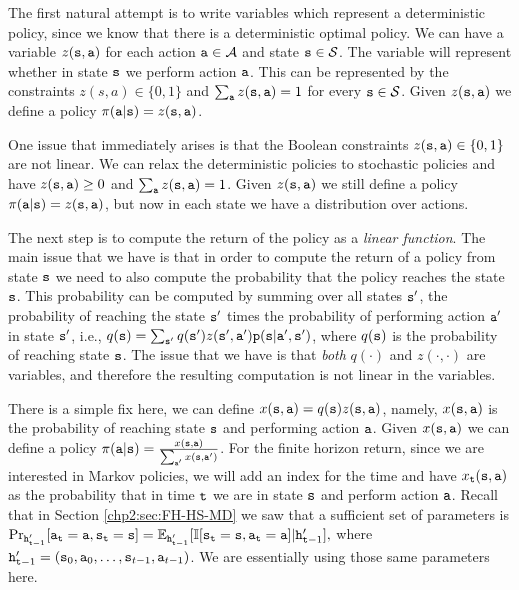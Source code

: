 The first natural attempt is to write variables which represent a deterministic policy, since we know that there is a deterministic optimal policy. We can have a variable $z({\tt s},{\tt a})$ for each action ${\tt a}\in\mathcal{A}$ and state ${\tt s}\in\mathcal{S}$. The variable will represent whether in state ${\tt s}$ we perform action ${\tt a}$. This can be represented by the constraints $z(s,a)\in\{0,1\}$ and $\sum_{{\tt a}}z({\tt s},{\tt a})=1$ for every ${\tt s} \in\mathcal{S}$. Given $z({\tt s},{\tt a})$ we define a policy $\pi({\tt a}|{\tt s})=z({\tt s},{\tt a})$.

One issue that immediately arises is that the Boolean constraints $z({\tt s},{\tt a})\in\{0,1\}$ are not linear. We can relax the deterministic policies to stochastic policies and have $z({\tt s},{\tt a})\geq 0$ and $\sum_{{\tt a}}z({\tt s},{\tt a})=1$. Given $z({\tt s},{\tt a})$ we still define a policy $\pi({\tt a}|{\tt s})=z({\tt s},{\tt a})$, but now in each state we have a distribution over actions.

The next step is to compute the return of the policy as a \textit{linear function}. The main issue that we have is that in order to compute the return of a policy from state ${\tt s}$ we need to also compute the probability that the policy reaches the state ${\tt s}$. This probability can be computed by summing over all states ${\tt s}'$, the probability of reaching the state ${\tt s}'$ times the probability of performing action ${\tt a}'$ in state ${\tt s}'$, i.e., $q({\tt s})=\sum_{{\tt s}'} q({\tt s}' )z({\tt s}',{\tt a}'){\tt p}({\tt s}|{\tt a}',{\tt s}')$, where $q({\tt s})$ is the probability of reaching state ${\tt s}$. The issue that we have is that \textit{both} $q(\cdot)$ and $z(\cdot,\cdot) $ are variables, and therefore the resulting computation is not linear in the variables.

There is a simple fix here, we can define $x({\tt s},{\tt a})=q({\tt s} )z({\tt s},{\tt a})$, namely, $x({\tt s},{\tt a})$ is the probability of reaching state ${\tt s}$ and performing action ${\tt a}$. Given $x({\tt s},{\tt a})$ we can define a policy $\pi({\tt a}|{\tt s})=\frac{x({\tt s},{\tt a})}{\sum_{{\tt a}'}x({\tt s},{\tt a}')}$. For the finite horizon return, since we are interested in Markov policies, we will add an index for the time and have $x_{\tt t}({\tt s},{\tt a})$ as the probability that in time ${\tt t}$ we are in state ${\tt s}$ and perform action ${\tt a}$.
%
Recall that in Section \ref{chp2:sec:FH-HS-MD} we saw that a sufficient set of parameters is
$\Pr_{{\tt h}'_{{\tt t}-1}}
[{\tt a}_{\tt t}={\tt a},{\tt s}_{\tt t}={\tt s}]=\mathbb{E}_{{\tt h}'_{{\tt t}-1}}[\mathbb{I}
[{\tt s}_{\tt t}={\tt s},{\tt a}_{\tt t}={\tt a}]| {\tt h}'_{{\tt t}-1}],
$
where
${\tt h}'_{{\tt t}-1}=({\tt s}_0,{\tt a}_0,\ldots,{\tt s}_{t-1},{\tt a}_{t-1})$. %
We are essentially using those same parameters here.

